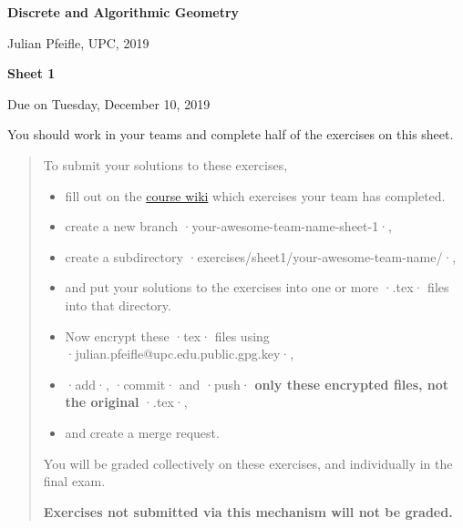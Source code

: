\documentclass[11pt]{amsart}
\newcommand{\alert}[1]{\textbf{\color{red}#1}}
\begin{document}
\DefineShortVerb{\·}

\begin{center}
\textbf{\sffamily
   Discrete and Algorithmic Geometry }

\medskip
   Julian Pfeifle,
   UPC, 2019
\end{center}

\medskip

\begin{center}
  \textbf{\sffamily Sheet 1}

  \bigskip
Due on Tuesday, December 10, 2019
\end{center}

\bigskip

You should work in your teams and complete half of the exercises on this sheet.

\bigskip

\begin{quote}\small
  To submit your solutions to these exercises,
  \begin{itemize}[$\quad\triangleright$]
  \item fill out on the \href{https://gitlab.com/julian-upc/2019-dag-upc/wikis/completed-exercises}{course wiki} which exercises your team has completed. 
  \item create a new branch ·your-awesome-team-name-sheet-1·,
  \item create a subdirectory ·exercises/sheet1/your-awesome-team-name/·,
  \item and put your solutions to the exercises into one or more ·.tex· files into that directory.
  \item Now encrypt these ·tex· files using ·julian.pfeifle@upc.edu.public.gpg.key·, 
  \item ·add·, ·commit· and ·push· \alert{only these encrypted files, not the original} ·.tex·,
  \item and create a merge request.
  \end{itemize}
  You will be graded collectively on these exercises, and individually in the final exam.

  \alert{Exercises not submitted via this mechanism will not be graded.}
\end{quote}
\end{document}
